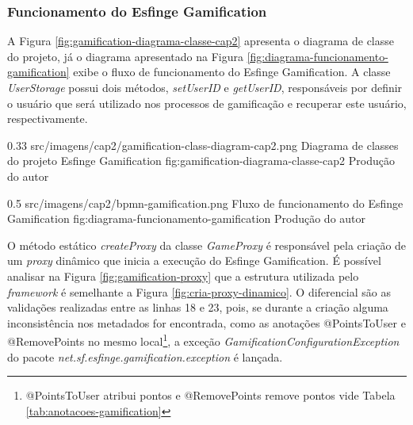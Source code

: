 \subsubsection{Funcionamento do Esfinge Gamification}

\par A Figura \ref{fig:gamification-diagrama-classe-cap2} apresenta o diagrama de classe do projeto, já o diagrama apresentado na Figura \ref{fig:diagrama-funcionamento-gamification} exibe o fluxo de funcionamento do Esfinge Gamification. A classe \textit{UserStorage} possui dois métodos, \textit{setUserID} e \textit{getUserID}, responsáveis por definir o usuário que será utilizado nos processos de gamificação e recuperar este usuário, respectivamente.

\begin{image}
{0.33} %
{src/imagens/cap2/gamification-class-diagram-cap2.png} %
{Diagrama de classes do projeto Esfinge Gamification} %
{fig:gamification-diagrama-classe-cap2} %
{Produção do autor} %
\end{image}

\begin{image}
{0.5} %
{src/imagens/cap2/bpmn-gamification.png} %
{Fluxo de funcionamento do Esfinge Gamification} %
{fig:diagrama-funcionamento-gamification} %
{Produção do autor} %
\end{image}

\par O método estático \textit{createProxy} da classe \textit{GameProxy} é responsável pela criação de um \textit{proxy} dinâmico que inicia a execução do Esfinge Gamification. É possível analisar na Figura \ref{fig:gamification-proxy} que a estrutura utilizada pelo \textit{framework} é semelhante a Figura \ref{fig:cria-proxy-dinamico}. O diferencial são as validações realizadas entre as linhas 18 e 23, pois, se durante a criação alguma inconsistência nos metadados for encontrada, como as anotações @PointsToUser e  @RemovePoints no mesmo local\footnote{@PointsToUser atribui pontos e @RemovePoints remove pontos vide Tabela \ref{tab:anotacoes-gamification}}, a exceção \textit{GamificationConfigurationException} do pacote \textit{net.sf.esfinge.gamification.exception} é lançada. 

